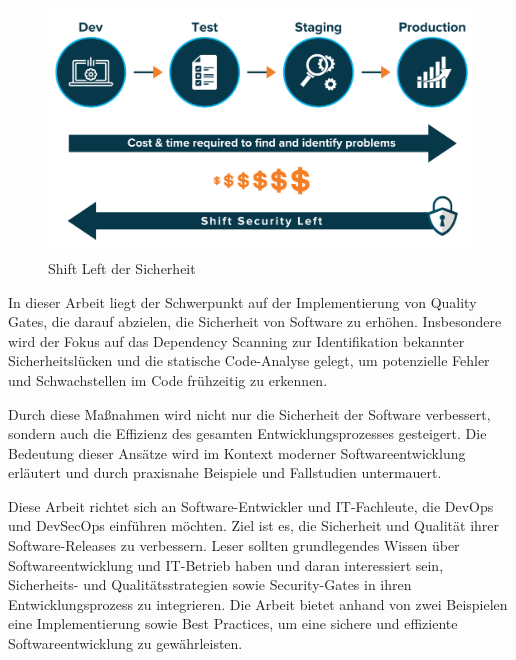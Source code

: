 \begin{figure}[h!]
  \includegraphics[width=\linewidth]{img/ShiftLeft.png}
  \caption{Shift Left der Sicherheit ~\cite{Haug2020}}
  \label{fig:shiftleft}
\end{figure}

In dieser Arbeit liegt der Schwerpunkt auf der Implementierung von Quality Gates, die darauf abzielen, die Sicherheit von Software zu erhöhen. Insbesondere wird der Fokus auf das Dependency Scanning zur Identifikation bekannter Sicherheitslücken und die statische Code-Analyse gelegt, um potenzielle Fehler und Schwachstellen im Code frühzeitig zu erkennen.

Durch diese Maßnahmen wird nicht nur die Sicherheit der Software verbessert, sondern auch die Effizienz des gesamten Entwicklungsprozesses gesteigert. Die Bedeutung dieser Ansätze wird im Kontext moderner Softwareentwicklung erläutert und durch praxisnahe Beispiele und Fallstudien untermauert.


Diese Arbeit richtet sich an Software-Entwickler und IT-Fachleute, die DevOps und DevSecOps einführen möchten. Ziel ist es, die Sicherheit und Qualität ihrer Software-Releases zu verbessern. Leser sollten grundlegendes Wissen über Softwareentwicklung und IT-Betrieb haben und daran interessiert sein, Sicherheits- und Qualitätsstrategien sowie Security-Gates in ihren Entwicklungsprozess zu integrieren. Die Arbeit bietet anhand von zwei Beispielen eine Implementierung sowie Best Practices, um eine sichere und effiziente  Softwareentwicklung zu gewährleisten.